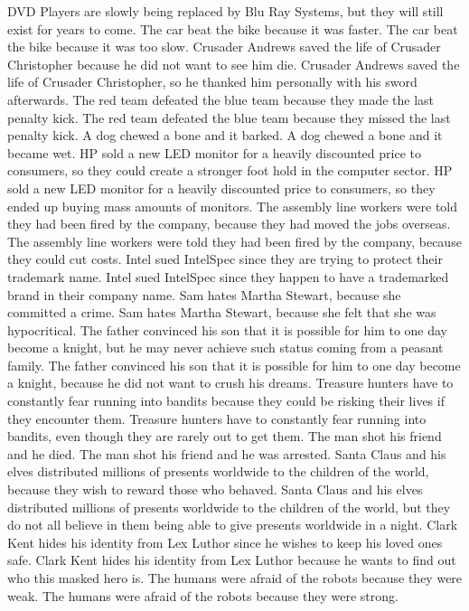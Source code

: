 \documentclass{article}
\begin{document}
\begin{enumerate}
DVD Players are slowly being replaced by Blu Ray Systems, but they will still exist for years to come.
The car beat the bike because it was faster.
The car beat the bike because it was too slow.
Crusader Andrews saved the life of Crusader Christopher because he did not want to see him die.
Crusader Andrews saved the life of Crusader Christopher, so he thanked him personally with his sword afterwards.
The red team defeated the blue team because they made the last penalty kick.
The red team defeated the blue team because they missed the last penalty kick.
A dog chewed a bone and it barked.
A dog chewed a bone and it became wet.
HP sold a new LED monitor for a heavily discounted price to consumers, so they could create a stronger foot hold in the computer sector.
HP sold a new LED monitor for a heavily discounted price to consumers, so they ended up buying mass amounts of monitors.
The assembly line workers were told they had been fired by the company, because they had moved the jobs overseas.
The assembly line workers were told they had been fired by the company, because they could cut costs.
Intel sued IntelSpec since they are trying to protect their trademark name.
Intel sued IntelSpec since they happen to have a trademarked brand in their company name.
Sam hates Martha Stewart, because she committed a crime.
Sam hates Martha Stewart, because she felt that she was hypocritical.
The father convinced his son that it is possible for him to one day become a knight, but he may never achieve such status coming from a peasant family.
The father convinced his son that it is possible for him to one day become a knight, because he did not want to crush his dreams.
Treasure hunters have to constantly fear running into bandits because they could be risking their lives if they encounter them.
Treasure hunters have to constantly fear running into bandits, even though they are rarely out to get them.
The man shot his friend and he died.
The man shot his friend and he was arrested.
Santa Claus and his elves distributed millions of presents worldwide to the children of the world, because they wish to reward those who behaved.
Santa Claus and his elves distributed millions of presents worldwide to the children of the world, but they do not all believe in them being able to give presents worldwide in a night.
Clark Kent hides his identity from Lex Luthor since he wishes to keep his loved ones safe.
Clark Kent hides his identity from Lex Luthor because he wants to find out who this masked hero is.
The humans were afraid of the robots because they were weak.
The humans were afraid of the robots because they were strong.

\end{enumerate}
\end{document}
